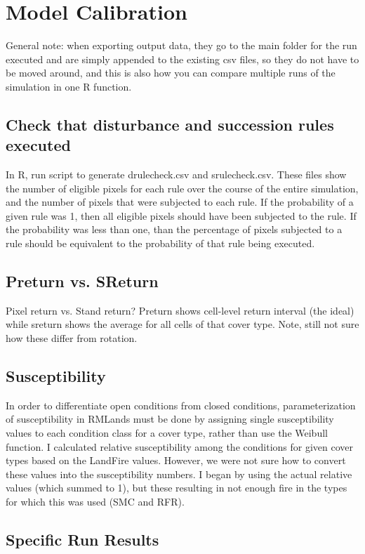 \chapter{Model Calibration}
General note: when exporting output data, they go to the main folder for the run executed and are simply appended to the existing csv files, so they do not have to be moved around, and this is also how you can compare multiple runs of the simulation in one R function. 

\section{Check that disturbance and succession rules executed}
In R, run script to generate drulecheck.csv and srulecheck.csv. These files show the number of eligible pixels for each rule over the course of the entire simulation, and the number of pixels that were subjected to each rule. If the probability of a given rule was 1, then all eligible pixels should have been subjected to the rule. If the probability was less than one, than the percentage of pixels subjected to a rule should be equivalent to the probability of that rule being executed.

\section{Preturn vs. SReturn}
Pixel return vs. Stand return? Preturn shows cell-level return interval (the ideal) while sreturn shows the average for all cells of that cover type. Note, still not sure how these differ from rotation.

\section{Susceptibility}
In order to differentiate open conditions from closed conditions, parameterization of susceptibility in RMLands must be done by assigning single susceptibility values to each condition class for a cover type, rather than use the Weibull function. I calculated relative susceptibility among the conditions for given cover types based on the LandFire values. However, we were not sure how to convert these values into the susceptibility numbers. I began by using the actual relative values (which summed to 1), but these resulting in not enough fire in the types for which this was used (SMC and RFR).

\section{Specific Run Results}

